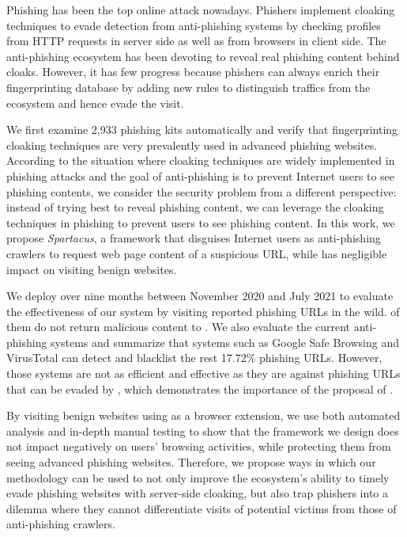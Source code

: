 Phishing has been the top online attack nowadays.
Phishers implement cloaking techniques to evade detection from anti-phishing systems by checking profiles from HTTP requests in server side as well as from browsers in client side.
The anti-phishing ecosystem has been devoting to reveal real phishing content behind cloaks.
However, it has few progress because phishers can always enrich their fingerprinting database by adding new rules to distinguish traffics from the ecosystem and hence evade the visit.

We first examine 2,933 phishing kits automatically and verify that fingerprinting cloaking techniques are very prevalently used in advanced phishing websites.
According to the situation where cloaking techniques are widely implemented in phishing attacks and the goal of anti-phishing is to prevent Internet users to see phishing contents, we consider the security problem from a different perspective:
instead of trying best to reveal phishing content, we can leverage the cloaking techniques in phishing to prevent users to see phishing content.
In this work, we propose \emph{Spartacus}, a framework that disguises Internet users as anti-phishing crawlers to request web page content of a suspicious URL, while has negligible impact on visiting benign websites.



We deploy \spartacus over nine months between November 2020 and July 2021 to evaluate the effectiveness of our system by visiting \totalphishing reported phishing URLs in the wild.
\evadedphishing of them do not return malicious content to \spartacus.
We also evaluate the current anti-phishing systems and summarize that systems such as Google Safe Browsing and VirusTotal can detect and blacklist the rest 17.72\% phishing URLs.
However, those systems are not as efficient and effective as they are against phishing URLs that can be evaded by \spartacus,
which demonstrates the importance of the proposal of \spartacus.

By visiting benign websites using \spartacus as a browser extension, we use both automated analysis and in-depth manual testing to show that the framework we design does not impact negatively on users' browsing activities, while protecting them from seeing advanced phishing websites.
Therefore, we propose ways in which our methodology can be used to not only improve the ecosystem’s ability to timely evade phishing websites with server-side cloaking, but also trap phishers into a dilemma where they cannot differentiate visits of potential victims from those of anti-phishing crawlers.
